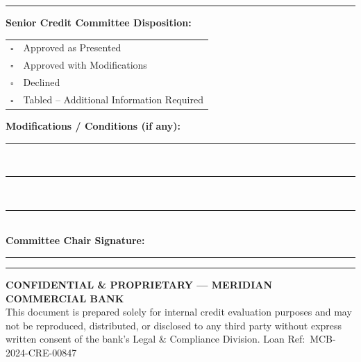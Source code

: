 \documentclass[11pt,a4paper]{article}
\begin{document}
\begin{tcolorbox}[
  enhanced, arc=3pt,
  colback=white, colframe=NavyInk,
  boxrule=0.8pt,
  top=10pt, bottom=12pt, left=12pt, right=12pt,
]
  \vspace{10pt}
  \noindent\textcolor{MidRule}{\rule{\linewidth}{0.5pt}}

  \vspace{6pt}
  \noindent
  \begin{minipage}[t]{0.48\textwidth}
    \vspace{0pt}
    {\small\bfseries Senior Credit Committee Disposition:}\\[6pt]
    \begin{tabular}{@{} l l @{}}
      $\square$ & Approved as Presented \\
      $\square$ & Approved with Modifications \\
      $\square$ & Declined \\
      $\square$ & Tabled -- Additional Information Required \\
    \end{tabular}
  \end{minipage}%
  \hfill
  \begin{minipage}[t]{0.46\textwidth}
    \vspace{0pt}
    {\small\bfseries Modifications / Conditions (if any):}\\[4pt]
    \textcolor{MidRule}{\rule{\linewidth}{0.4pt}}\\
    \textcolor{MidRule}{\rule{\linewidth}{0.4pt}}\\
    \textcolor{MidRule}{\rule{\linewidth}{0.4pt}}\\
    \vspace{8pt}
    {\small\bfseries Committee Chair Signature:}\\[4pt]
    \textcolor{MidRule}{\rule{0.65\linewidth}{0.4pt}}
    \textcolor{MidRule}{\rule{0.25\linewidth}{0.4pt}}
  \end{minipage}
\end{tcolorbox}

\vspace{6mm}

\begin{tcolorbox}[
  enhanced, arc=0pt,
  colback=NavyInk, colframe=NavyInk,
  top=5pt, bottom=5pt, left=10pt, right=10pt,
]
  \centering
  {\color{white}\scriptsize\bfseries CONFIDENTIAL \& PROPRIETARY — MERIDIAN COMMERCIAL BANK}\\
  {\color{MidRule}\scriptsize
  This document is prepared solely for internal credit evaluation purposes and may not be
  reproduced, distributed, or disclosed to any third party without express written consent
  of the bank's Legal \& Compliance Division.
  \quad\textbar\quad Loan Ref:\ MCB-2024-CRE-00847}
\end{tcolorbox}
\end{document}
